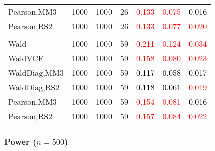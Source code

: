 \documentclass[
]{article}
\begin{document}
\begin{table}[H]
{\begin{tabular}[t]{lrrrrrr}
\hspace{1em}Pearson,MM3 & 1000 & 1000 & 26 & \textcolor{red}{0.133} & \textcolor{red}{0.075} & \textcolor{black}{0.016}\\
\hspace{1em}Pearson,RS2 & 1000 & 1000 & 26 & \textcolor{red}{0.133} & \textcolor{red}{0.077} & \textcolor{red}{0.020}\\
\addlinespace[0.3em]
\multicolumn{7}{l}{\textbf{3F 15V}}\\
\hspace{1em}Wald & 1000 & 1000 & 59 & \textcolor{red}{0.211} & \textcolor{red}{0.124} & \textcolor{red}{0.034}\\
\hspace{1em}WaldVCF & 1000 & 1000 & 59 & \textcolor{red}{0.158} & \textcolor{red}{0.080} & \textcolor{red}{0.023}\\
\hspace{1em}WaldDiag,MM3 & 1000 & 1000 & 59 & \textcolor{black}{0.117} & \textcolor{black}{0.058} & \textcolor{black}{0.017}\\
\hspace{1em}WaldDiag,RS2 & 1000 & 1000 & 59 & \textcolor{black}{0.118} & \textcolor{black}{0.061} & \textcolor{red}{0.019}\\
\hspace{1em}Pearson,MM3 & 1000 & 1000 & 59 & \textcolor{red}{0.154} & \textcolor{red}{0.081} & \textcolor{black}{0.016}\\
\hspace{1em}Pearson,RS2 & 1000 & 1000 & 59 & \textcolor{red}{0.157} & \textcolor{red}{0.084} & \textcolor{red}{0.022}\\
\bottomrule
\end{tabular}}
\endgroup{}
\end{table}

\hypertarget{power-n500-3}{%
\subsubsection{\texorpdfstring{Power
(\(n=500\))}{Power (n=500)}}\label{power-n500-3}}
\end{document}
